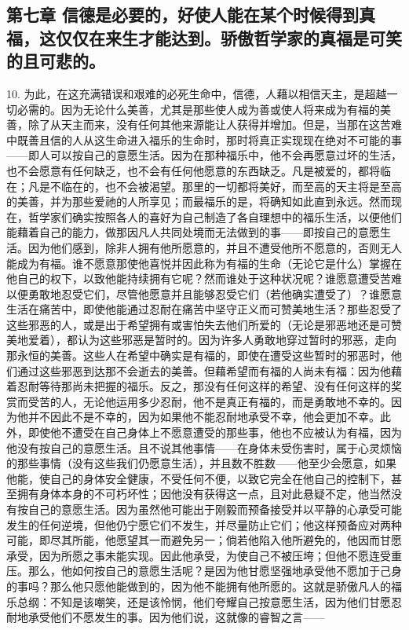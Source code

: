 
\subsection{第七章 信德是必要的，好使人能在某个时候得到真福，这仅仅在来生才能达到。骄傲哲学家的真福是可笑的且可悲的。}

10. 为此，在这充满错误和艰难的必死生命中，信德，人藉以相信天主，是超越一切必需的。因为无论什么美善，尤其是那些使人成为善或使人将来成为有福的美善，除了从天主而来，没有任何其他来源能让人获得并增加。但是，当那在这苦难中既善且信的人从这生命进入福乐的生命时，那时将真正实现现在绝对不可能的事——即人可以按自己的意愿生活。因为在那种福乐中，他不会再愿意过坏的生活，也不会愿意有任何缺乏，也不会有任何他愿意的东西缺乏。凡是被爱的，都将临在；凡是不临在的，也不会被渴望。那里的一切都将美好，而至高的天主将是至高的美善，并为那些爱祂的人所享见；而最福乐的是，将确知如此直到永远。然而现在，哲学家们确实按照各人的喜好为自己制造了各自理想中的福乐生活，以便他们能藉着自己的能力，做那因凡人共同处境而无法做到的事——即按自己的意愿生活。因为他们感到，除非人拥有他所愿意的，并且不遭受他所不愿意的，否则无人能成为有福。谁不愿意那使他喜悦并因此称为有福的生命（无论它是什么）掌握在他自己的权下，以致他能持续拥有它呢？然而谁处于这种状况呢？谁愿意遭受苦难以便勇敢地忍受它们，尽管他愿意并且能够忍受它们（若他确实遭受了）？谁愿意生活在痛苦中，即使他能通过忍耐在痛苦中坚守正义而可赞美地生活？那些忍受了这些邪恶的人，或是出于希望拥有或害怕失去他们所爱的（无论是邪恶地还是可赞美地爱着），都认为这些邪恶是暂时的。因为许多人勇敢地穿过暂时的邪恶，走向那永恒的美善。这些人在希望中确实是有福的，即使在遭受这些暂时的邪恶时，他们通过这些邪恶到达那不会逝去的美善。但藉希望而有福的人尚未有福：因为他藉着忍耐等待那尚未把握的福乐。反之，那没有任何这样的希望、没有任何这样的奖赏而受苦的人，无论他运用多少忍耐，他不是真正有福的，而是勇敢地不幸的。因为他并不因此不是不幸的，因为如果他不能忍耐地承受不幸，他会更加不幸。此外，即使他不遭受在自己身体上不愿意遭受的那些事，他也不应被认为有福，因为他没有按自己的意愿生活。且不说其他事情——在身体未受伤害时，属于心灵烦恼的那些事情（没有这些我们仍愿意生活），并且数不胜数——他至少会愿意，如果他能，使自己的身体安全健康，不受任何不便，以致它完全在他自己的控制下，甚至拥有身体本身的不可朽坏性；因他没有获得这一点，且对此悬疑不定，他当然没有按自己的意愿生活。因为虽然他可能出于刚毅而预备接受并以平静的心承受可能发生的任何逆境，但他仍宁愿它们不发生，并尽量防止它们；他这样预备应对两种可能，即尽其所能，他愿望其一而避免另一；倘若他陷入他所避免的，他因而甘愿承受，因为所愿之事未能实现。因此他承受，为使自己不被压垮；但他不愿连受重压。那么，他如何按自己的意愿生活呢？是因为他甘愿坚强地承受他不愿加于己身的事吗？那么他只愿他能做到的，因为他不能拥有他所愿的。这就是骄傲凡人的福乐总纲：不知是该嘲笑，还是该怜悯，他们夸耀自己按意愿生活，因为他们甘愿忍耐地承受他们不愿发生的事。因为他们说，这就像的睿智之言——\par

